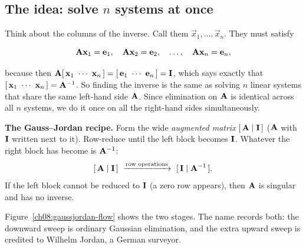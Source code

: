 \subsection{The idea: solve $n$ systems at once}

Think about the columns of the inverse. Call them $\vec{x}_1,\dots,\vec{x}_n$. They must satisfy

\[
\mathbf{A}\mathbf{x}_1 = \mathbf{e}_1,\quad
\mathbf{A}\mathbf{x}_2 = \mathbf{e}_2,\quad \dots,\quad
\mathbf{A}\mathbf{x}_n = \mathbf{e}_n,
\]

because then $\mat{A}[\,\vec{x}_1\ \cdots\ \vec{x}_n\,] = [\,\vec{e}_1\ \cdots\ \vec{e}_n\,]
= \mat{I}$, which says exactly that $[\,\mathbf{x}_1\ \cdots\ \mathbf{x}_n\,] = \mathbf{A}^{-1}$.
So finding the inverse is the same as solving $n$ linear systems that share the same
left-hand side $\mathbf{A}$. Since elimination on $\mathbf{A}$ is identical across all $n$
systems, we do it once on all the right-hand sides simultaneously.

\begin{focusbox}
\textbf{The Gauss--Jordan recipe.} Form the wide \emph{augmented matrix}
$[\,\mathbf{A}\mid\mathbf{I}\,]$ ($\mathbf{A}$ with $\mathbf{I}$ written next to it). Row-reduce until
the left block becomes $\mathbf{I}$. Whatever the right block has become is $\mathbf{A}^{-1}$:
\[
[\,\mat{A}\mid \mat{I}\,] \ \xrightarrow{\text{row operations}}\ [\,\mat{I}\mid \mat{A}\inv\,].
\]
If the left block cannot be reduced to $\mathbf{I}$ (a zero row appears), then $\mathbf{A}$ is
singular and has no inverse.
\end{focusbox}

Figure~\ref{ch08:gaussjordan-flow} shows the two stages. The name records both:
the downward sweep is ordinary Gaussian elimination, and the extra upward sweep
is credited to Wilhelm Jordan, a German surveyor.

